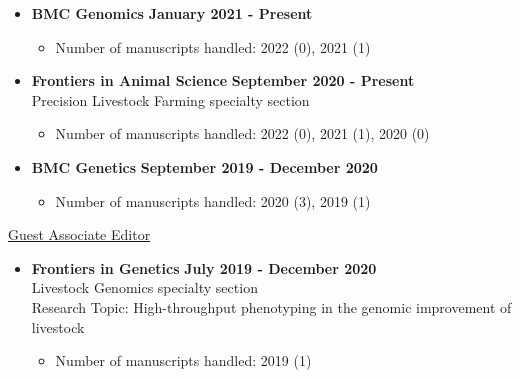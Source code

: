 \documentclass[margin,line,10pt]{res}
\begin{document}
\begin{resume}
  \vspace{0.3cm}

\begin{itemize}
\item {\bf BMC Genomics} \hfill {\bf January 2021 - Present}
  \begin{itemize}
    \item Number of manuscripts handled: 2022 (0), 2021 (1)
  \end{itemize}
\end{itemize}

\vspace{0.3cm}

\begin{itemize}
\item {\bf Frontiers in Animal Science} \hfill {\bf September 2020 - Present} \\
   Precision Livestock Farming specialty section
  \begin{itemize}
    \item Number of manuscripts handled: 2022 (0), 2021 (1), 2020 (0)
  \end{itemize}
\end{itemize}

\vspace{0.3cm}

\begin{itemize}
\item {\bf BMC Genetics} \hfill {\bf September 2019 - December 2020}
  \begin{itemize}
    \item Number of manuscripts handled: 2020 (3), 2019 (1)
  \end{itemize}
\end{itemize}




  \vspace{0.3cm}


\underline{Guest Associate Editor}
\vspace{0.2cm}
\begin{itemize}
\item {\bf Frontiers in Genetics} \hfill  {\bf July 2019 - December 2020} \\
  Livestock Genomics specialty section \\
  Research Topic: High-throughput phenotyping in the genomic improvement of livestock
  \begin{itemize}
    \item Number of manuscripts handled: 2019 (1)
  \end{itemize}
\end{itemize}
\vspace{0.3cm}



\end{resume}
\end{document}
